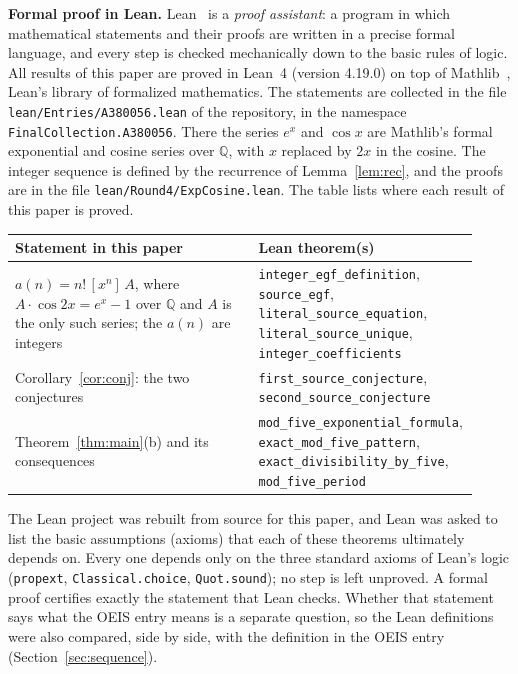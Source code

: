 \documentclass[11pt,a4paper]{article}
\theoremstyle{definition}
\theoremstyle{remark}
\newcommand{\Q}{\mathbb{Q}}
\newcommand{\coeff}[2]{[x^{#1}]\,#2}
\newcommand{\para}[1]{\par\medskip\noindent\textbf{#1}\enspace}
\begin{document}
\para{Formal proof in Lean.}
Lean~\cite{lean} is a \emph{proof assistant}: a program in which mathematical statements and their proofs are written
in a precise formal language, and every step is checked mechanically down to the basic rules of logic. All results of
this paper are proved in Lean~4 (version 4.19.0) on top of Mathlib~\cite{mathlib}, Lean's library of formalized
mathematics. The statements are collected in the file \texttt{lean/Entries/A380056.lean} of the repository,
in the namespace \texttt{FinalCollection.A380056}. There the series $e^x$ and $\cos x$ are Mathlib's formal exponential and cosine series over $\Q$, with $x$ replaced by $2x$ in the cosine. The integer sequence is defined by the recurrence of Lemma~\ref{lem:rec}, and the proofs are in the file \texttt{lean/Round4/ExpCosine.lean}.
The table lists where each result of this paper is proved.
\begin{center}\small\renewcommand{\arraystretch}{1.25}
\begin{tabular}{>{\raggedright\arraybackslash}p{0.52\linewidth}>{\raggedright\arraybackslash}p{0.4\linewidth}}
\toprule
Statement in this paper & Lean theorem(s)\\
\midrule
$a(n)=n!\,\coeff{n}{A}$, where $A\cdot\cos2x=e^x-1$ over $\Q$ and $A$ is the only such series; the $a(n)$ are integers & \texttt{integer\_\allowbreak{}egf\_\allowbreak{}definition}, \texttt{source\_\allowbreak{}egf}, \texttt{literal\_\allowbreak{}source\_\allowbreak{}equation}, \texttt{literal\_\allowbreak{}source\_\allowbreak{}unique}, \texttt{integer\_\allowbreak{}coefficients} \\
Corollary~\ref{cor:conj}: the two conjectures & \texttt{first\_\allowbreak{}source\_\allowbreak{}conjecture}, \texttt{second\_\allowbreak{}source\_\allowbreak{}conjecture} \\
Theorem~\ref{thm:main}(b) and its consequences & \texttt{mod\_\allowbreak{}five\_\allowbreak{}exponential\_\allowbreak{}formula}, \texttt{exact\_\allowbreak{}mod\_\allowbreak{}five\_\allowbreak{}pattern}, \texttt{exact\_\allowbreak{}divisibility\_\allowbreak{}by\_\allowbreak{}five}, \texttt{mod\_\allowbreak{}five\_\allowbreak{}period} \\
\bottomrule
\end{tabular}
\end{center}
The Lean project was rebuilt from source for this paper, and Lean was asked to list the basic assumptions (axioms)
that each of these theorems ultimately depends on. Every one depends only on the three standard axioms of Lean's logic
(\texttt{propext}, \texttt{Classical.choice}, \texttt{Quot.sound}); no step is left unproved. A formal proof certifies
exactly the statement that Lean checks. Whether that statement says what the OEIS entry means is a separate question,
so the Lean definitions were also compared, side by side, with the definition in the OEIS entry
(Section~\ref{sec:sequence}).
\end{document}
